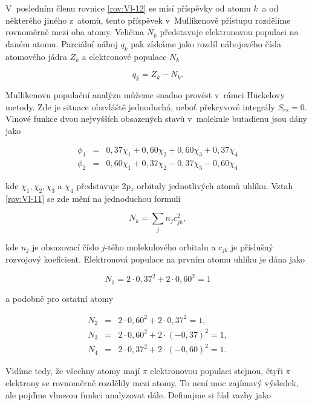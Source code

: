 \noindent V~posledním členu rovnice \eqref{rov:Vl-12} se mísí příspěvky od atomu $k$~a od některého jiného z~atomů, tento příspěvek v~Mullikenově přístupu rozdělíme rovnoměrně mezi oba atomy. Veličina $N_k$ představuje elektronovou populaci na daném atomu. Parciální náboj $q_k$ pak získáme jako rozdíl nábojového čísla atomového jádra $Z_k$ a elektronové populace $N_k$

\begin{equation}
q_k = Z_k - N_k.
\label{rov:Vl-13}
\end{equation}


\begin{priklad}
Mullikenovu populační analýzu můžeme snadno provést v~rámci H\"uckelovy metody. Zde je situace obzvláště jednoduchá, neboť překryvové integrály $S_{rs}=0$. Vlnové funkce dvou nejvyšších obsazených stavů v~molekule butadienu jsou dány jako

\begin{eqnarray*}
\phi_1 &=& 0{,}37 \chi_1 + 0{,}60 \chi_2 + 0{,}60 \chi_3 + 0{,}37 \chi_4\\
\phi_2 &=& 0{,}60 \chi_1 + 0{,}37 \chi_2 - 0{,}37 \chi_3 - 0{,}60 \chi_4
\end{eqnarray*}
 
\noindent kde $\chi_1,\chi_2, \chi_3$ a $\chi_4$ představuje 2p$_z$ orbitaly jednotlivých atomů uhlíku. Vztah \eqref{rov:Vl-11} se zde mění na jednoduchou formuli

\begin{equation}
N_k = \sum_j n_j c_{jk}^2, \nonumber
\end{equation}

\noindent kde $n_j$ je obsazovací číslo $j$-tého molekulového orbitalu a $c_{jk}$ je příslušný rozvojový koeficient. Elektronová populace na prvním atomu uhlíku je dána jako

\begin{equation}
N_1 = 2 \cdot 0{,}37^2 + 2 \cdot 0{,}60^2 = 1 \nonumber
\end{equation}


\noindent a podobně pro ostatní atomy

\begin{eqnarray*}
N_2 &=& 2 \cdot 0{,}60^2 + 2 \cdot 0{,}37^2 = 1, \\
N_3 &=& 2 \cdot 0{,}60^2 + 2 \cdot (-0{,}37)^2 = 1, \\
N_4 &=& 2 \cdot 0{,}37^2 + 2 \cdot (-0{,}60)^2 = 1.
\end{eqnarray*}

Vidíme tedy, že všechny atomy mají $\pi$ elektronovou populaci stejnou, čtyři $\pi$ elektrony se rovnoměrně rozdělily mezi atomy. To není moc zajímavý výsledek, ale pojďme vlnovou funkci analyzovat dále. Definujme si řád vazby jako



\end{priklad}
